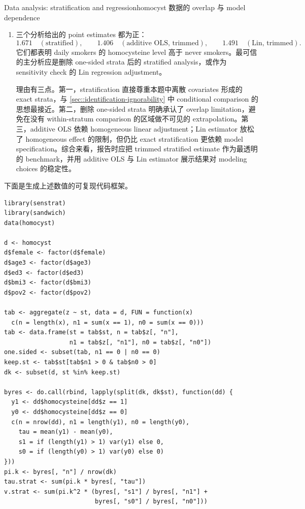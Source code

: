 \begin{exercisesolution}{Data analysis: stratification and regression}{homocyst 数据的 overlap 与 model dependence}
\begin{enumerate}[(1)]
如果不删除只含 treated units 或只含 control units 的 strata，fully saturated stratum analysis 会出现不可估计的 interaction terms。具体地，拟合  时，全样本模型有 $216$ 个 nominal coefficients，但 rank 只有 $198$，有 $18$ 个 aliased coefficients。这正好对应 $18$ 个 one-sided strata：在这些 strata 内没有 within-stratum treated-control comparison。相比之下，Lin estimator 只对较低维 covariates 做 interactions，因此仍然可以数值拟合；但它的 causal interpretation 仍依赖 outcome model extrapolation，而不是这些 one-sided strata 内真实存在的 direct comparison。

\item
三个分析给出的 point estimates 都为正：
\[
1.671\quad(\text{stratified}),\qquad
1.406\quad(\text{additive OLS, trimmed}),\qquad
1.491\quad(\text{Lin, trimmed}).
\]
它们都表明 daily smokers 的 homocysteine level 高于 never smokers。最可信的主分析应是删除 one-sided strata 后的 stratified analysis，或作为 sensitivity check 的 Lin regression adjustment。

理由有三点。第一，stratification 直接尊重本题中离散 covariates 形成的 exact strata，与 \cref{sec::identification-ignorability} 中 conditional comparison 的思想最接近。第二，删除 one-sided strata 明确承认了 overlap limitation，避免在没有 within-stratum comparison 的区域做不可见的 extrapolation。第三，additive OLS 依赖 homogeneous linear adjustment；Lin estimator 放松了 homogeneous effect 的限制，但仍比 exact stratification 更依赖 model specification。综合来看，报告时应把 trimmed stratified estimate 作为最透明的 benchmark，并用 additive OLS 与 Lin estimator 展示结果对 modeling choices 的稳定性。
\end{enumerate}

下面是生成上述数值的可复现代码框架。
\begin{lstlisting}
library(senstrat)
library(sandwich)
data(homocyst)

d <- homocyst
d$female <- factor(d$female)
d$age3 <- factor(d$age3)
d$ed3 <- factor(d$ed3)
d$bmi3 <- factor(d$bmi3)
d$pov2 <- factor(d$pov2)

tab <- aggregate(z ~ st, data = d, FUN = function(x)
  c(n = length(x), n1 = sum(x == 1), n0 = sum(x == 0)))
tab <- data.frame(st = tab$st, n = tab$z[, "n"],
                  n1 = tab$z[, "n1"], n0 = tab$z[, "n0"])
one.sided <- subset(tab, n1 == 0 | n0 == 0)
keep.st <- tab$st[tab$n1 > 0 & tab$n0 > 0]
dk <- subset(d, st %in% keep.st)

byres <- do.call(rbind, lapply(split(dk, dk$st), function(dd) {
  y1 <- dd$homocysteine[dd$z == 1]
  y0 <- dd$homocysteine[dd$z == 0]
  c(n = nrow(dd), n1 = length(y1), n0 = length(y0),
    tau = mean(y1) - mean(y0),
    s1 = if (length(y1) > 1) var(y1) else 0,
    s0 = if (length(y0) > 1) var(y0) else 0)
}))
pi.k <- byres[, "n"] / nrow(dk)
tau.strat <- sum(pi.k * byres[, "tau"])
v.strat <- sum(pi.k^2 * (byres[, "s1"] / byres[, "n1"] +
                         byres[, "s0"] / byres[, "n0"]))


\end{lstlisting}
\end{exercisesolution}
